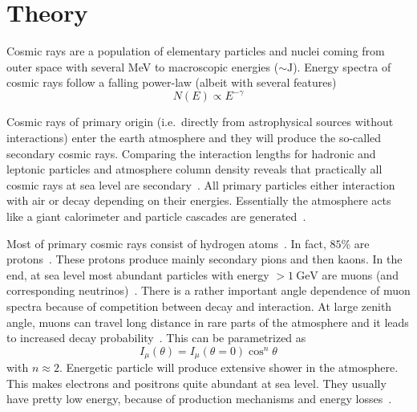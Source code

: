 \section{Theory}
Cosmic rays are a population of elementary particles and nuclei coming from outer space with several \si{\mega\eV} to macroscopic energies ($\sim\si{\joule}$). Energy spectra of cosmic rays follow a falling power-law (albeit with several features)~\cite{PDG}~\cite{Gaisser}
\begin{equation*}
	N(E) \propto E^{-\gamma}
\end{equation*}

Cosmic rays of primary origin (i.e.~directly from astrophysical sources without interactions) enter the earth atmosphere and they will produce the so-called secondary cosmic rays. Comparing the interaction lengths for hadronic and leptonic particles and atmosphere column density reveals that practically all cosmic rays at sea level are secondary~\cite{grupen}. All primary particles either interaction with air or decay depending on their energies. Essentially the atmosphere acts like a giant calorimeter and particle cascades are generated~\cite{grupen}.

Most of primary cosmic rays consist of hydrogen atoms~\cite{Gaisser}. In fact, $85\%$ are protons~\cite{grupen}. These protons produce mainly secondary pions and then kaons. In the end, at sea level most abundant particles with energy $>\SI{1}{\giga\eV}$ are muons (and corresponding neutrinos)~\cite{PDG}. There is a rather important angle dependence of muon spectra because of competition between decay and interaction. At large zenith angle, muons can travel long distance in rare parts of the atmosphere and it leads to increased decay probability~\cite{grupen}. This can be parametrized as~\cite{grupen}
\begin{equation}
	I_\mu (\theta) = I_\mu (\theta = 0) \cos^n \theta
\end{equation}
with $n\approx 2$. Energetic particle will produce extensive shower in the atmosphere.	This makes electrons and positrons quite abundant at sea level. They usually have pretty low energy, because of production mechanisms and energy losses~\cite{grupen}.
